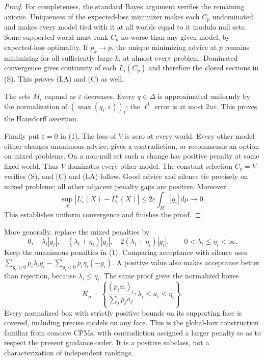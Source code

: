 \documentclass[11pt]{article}
\theoremstyle{remark}\newtheorem{remark}[theorem]{Remark}
\begin{document}
\begin{proof}
For completeness, the standard Bayes argument verifies the remaining
axioms. Uniqueness of the expected-loss minimizer makes each $C_p$
undominated and makes every model tied with it at all worlds equal to
it modulo null sets. Some supported world must rank $C_p$ no worse than
any given model, by expected-loss optimality. If $p_k\to p$, the unique
minimizing advice at $p$ remains minimizing for all sufficiently large
$k$, at almost every problem. Dominated convergence gives continuity of
each $L_i(C_p)$ and therefore the closed sections in (S). This proves
(LA) and (C) as well.

The sets $M_\varepsilon$ expand as $\varepsilon$ decreases. Every
$q\in\Delta$ is approximated uniformly by the normalization of
$(\max(q_i,\varepsilon))_i$; the $\ell^1$ error is at most $2n\varepsilon$.
This proves the Hausdorff assertion.

Finally put $\varepsilon=0$ in (1). The loss of $V$ is zero at every
world. Every other model either changes unanimous advice, gives a
contradiction, or recommends an option on mixed problems. On a non-null
set such a change has positive penalty at some fixed world. Thus $V$
dominates every other model. The constant selection $C_p=V$ verifies (S),
and (C) and (LA) follow. Good advice and silence tie precisely on mixed
problems; all other adjacent penalty gaps are positive. Moreover
\[
 \sup_X|L_i^\varepsilon(X)-L_i^0(X)|
 \le 2\varepsilon\int_H|g_i|\,d\mu\longrightarrow0.
\]
This establishes uniform convergence and finishes the proof.
\end{proof}

More generally, replace the mixed penalties by
\[
 0,\quad \lambda_i|g_i|,\quad(\lambda_i+\eta_i)|g_i|,
 \quad2(\lambda_i+\eta_i)|g_i|,
 \qquad 0<\lambda_i\le\eta_i<\infty.
\tag{3}
\]
Keep the unanimous penalties in (1). Comparing acceptance with silence
uses $\sum_{g_i>0}p_i\lambda_i g_i-
\sum_{g_i<0}p_i\eta_i(-g_i)$. A positive value also makes acceptance
better than rejection, because $\lambda_i\le\eta_i$.
The same proof gives the normalized boxes
\[
 K_p=\left\{\frac{(p_i a_i)_i}{\sum_jp_j a_j}:
                   \lambda_i\le a_i\le\eta_i\right\}.
\tag{4}
\]
Every normalized box with strictly positive bounds on its supporting
face is covered, including precise models on any face. This is the
global-box construction familiar from concave CPMs, with contradiction
assigned a larger penalty so as to respect the present guidance order.
It is a positive subclass, not a characterization of independent rankings.
\end{document}
